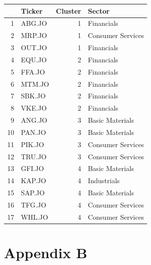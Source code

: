 \documentclass[11pt,preprint, authoryear]{elsarticle}
\let\origtable\table
\let\endorigtable\endtable
\renewenvironment{table}[1][2] {
    \expandafter\origtable\expandafter[H]
} {
    \endorigtable
}
\numberwithin{equation}{section}
\numberwithin{figure}{section}
\numberwithin{table}{section}
\begin{document}
\begin{table}[H]
\centering
\begin{tabular}{rlrl}
  \hline
 & Ticker & Cluster & Sector \\ 
  \hline
1 & ABG.JO &   1 & Financials \\ 
  2 & MRP.JO &   1 & Consumer Services \\ 
  3 & OUT.JO &   1 & Financials \\ 
  4 & EQU.JO &   2 & Financials \\ 
  5 & FFA.JO &   2 & Financials \\ 
  6 & MTM.JO &   2 & Financials \\ 
  7 & SBK.JO &   2 & Financials \\ 
  8 & VKE.JO &   2 & Financials \\ 
  9 & ANG.JO &   3 & Basic Materials \\ 
  10 & PAN.JO &   3 & Basic Materials \\ 
  11 & PIK.JO &   3 & Consumer Services \\ 
  12 & TRU.JO &   3 & Consumer Services \\ 
  13 & GFI.JO &   4 & Basic Materials \\ 
  14 & KAP.JO &   4 & Industrials \\ 
  15 & SAP.JO &   4 & Basic Materials \\ 
  16 & TFG.JO &   4 & Consumer Services \\ 
  17 & WHL.JO &   4 & Consumer Services \\ 
   \hline
\end{tabular}
\caption{Stock Classification by Sector and Cluster \label{tab2}} 
\end{table}

\newpage

\newpage

\hypertarget{appendix-b}{%
\section{\texorpdfstring{Appendix B
\label{app2}}{Appendix B }}\label{appendix-b}}
\end{document}

